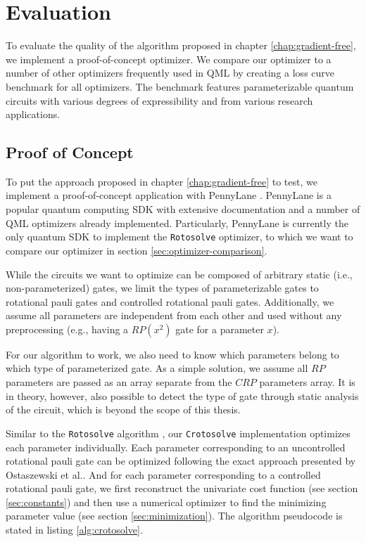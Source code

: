 \chapter{Evaluation}
\label{chap:evaluation}

To evaluate the quality of the algorithm proposed in chapter
\ref{chap:gradient-free}, we implement a proof-of-concept optimizer.
We compare our optimizer to a number of other optimizers frequently used in QML
by creating a loss curve benchmark for all optimizers.
The benchmark features parameterizable quantum circuits with various degrees of
expressibility and from various research applications.

\section{Proof of Concept}
To put the approach proposed in chapter \ref{chap:gradient-free} to test,
we implement a proof-of-concept application with PennyLane
\cite{bergholm_pennylane_2022}.
PennyLane is a popular \cite{unitary_fund_team_results_2022} quantum computing
SDK with extensive documentation and a number of QML optimizers already
implemented.
Particularly, PennyLane is currently the only quantum SDK to implement the
\texttt{Rotosolve} optimizer, to which we want to compare our optimizer in
section \ref{sec:optimizer-comparison}.

While the circuits we want to optimize can be composed of arbitrary static
(i.e., non-parameterized) gates, we limit the types of parameterizable gates to
rotational pauli gates and controlled rotational pauli gates.
Additionally, we assume all parameters are independent from each other and used
without any preprocessing (e.g., having a $RP(x^2)$ gate for a parameter $x$).

For our algorithm to work, we also need to know which parameters belong to which
type of parameterized gate.
As a simple solution, we assume all $RP$ parameters are passed as an array
separate from the $CRP$ parameters array.
It is in theory, however, also possible to detect the type of gate through static analysis
of the circuit, which is beyond the scope of this thesis.

Similar to the \texttt{Rotosolve} algorithm \cite{ostaszewski_structure_2021},
our \texttt{Crotosolve} implementation optimizes each parameter individually.
Each parameter corresponding to an uncontrolled rotational pauli gate can be
optimized following the exact approach presented by Ostaszewski et al..
And for each parameter corresponding to a controlled rotational pauli gate, we
first reconstruct the univariate cost function (see section \ref{sec:constants})
and then use a numerical optimizer to find the minimizing parameter value (see
section \ref{sec:minimization}).
The algorithm pseudocode is stated in listing \ref{alg:crotosolve}.

